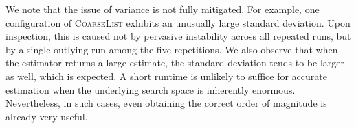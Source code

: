 \documentclass[acmsmall]{acmart}
\newcommand{\testor}{\textsc{TeStor}\xspace}
\begin{document}
We note that the issue of variance is not fully mitigated.
For example, one configuration of \textsc{CoarseList} exhibits an unusually large standard deviation. 
Upon inspection, this is caused not by pervasive instability across all repeated runs, but by a single outlying run among the five repetitions. 
We also observe that when the estimator returns a large estimate, the standard deviation tends to be larger as well, which is expected. 
A short runtime is unlikely to suffice for accurate estimation when the underlying search space is inherently enormous. Nevertheless, in such cases, even obtaining the correct order of magnitude is already very useful.



\end{document}
